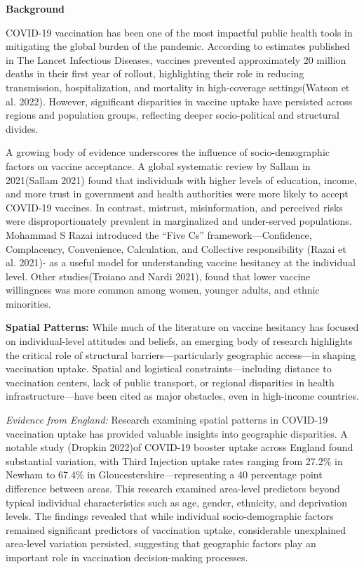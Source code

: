 \documentclass{article}
\begin{document}
\textbf{Background}

COVID-19 vaccination has been one of the most impactful public health
tools in mitigating the global burden of the pandemic. According to
estimates published in The Lancet Infectious Diseases, vaccines
prevented approximately 20 million deaths in their first year of
rollout, highlighting their role in reducing transmission,
hospitalization, and mortality in high-coverage settings(Watson et al.
2022). However, significant disparities in vaccine uptake have persisted
across regions and population groups, reflecting deeper socio-political
and structural divides.

A growing body of evidence underscores the influence of
socio-demographic factors on vaccine acceptance. A global systematic
review by Sallam in 2021(Sallam 2021) found that individuals with higher
levels of education, income, and more trust in government and health
authorities were more likely to accept COVID-19 vaccines. In contrast,
mistrust, misinformation, and perceived risks were disproportionately
prevalent in marginalized and under-served populations. Mohammad S Razai
introduced the ``Five Cs'' framework---Confidence, Complacency,
Convenience, Calculation, and Collective responsibility (Razai et al.
2021)- as a useful model for understanding vaccine hesitancy at the
individual level. Other studies(Troiano and Nardi 2021), found that
lower vaccine willingness was more common among women, younger adults,
and ethnic minorities.

\textbf{Spatial Patterns:} While much of the literature on vaccine
hesitancy has focused on individual-level attitudes and beliefs, an
emerging body of research highlights the critical role of structural
barriers---particularly geographic access---in shaping vaccination
uptake. Spatial and logistical constraints---including distance to
vaccination centers, lack of public transport, or regional disparities
in health infrastructure---have been cited as major obstacles, even in
high-income countries.

\emph{Evidence from England:} Research examining spatial patterns in
COVID-19 vaccination uptake has provided valuable insights into
geographic disparities. A notable study (Dropkin 2022)of COVID-19
booster uptake across England found substantial variation, with Third
Injection uptake rates ranging from 27.2\% in Newham to 67.4\% in
Gloucestershire---representing a 40 percentage point difference between
areas. This research examined area-level predictors beyond typical
individual characteristics such as age, gender, ethnicity, and
deprivation levels. The findings revealed that while individual
socio-demographic factors remained significant predictors of vaccination
uptake, considerable unexplained area-level variation persisted,
suggesting that geographic factors play an important role in vaccination
decision-making processes.
\end{document}
